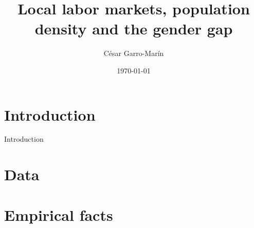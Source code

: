 \documentclass[10pt]{beamer}
\title{Local labor markets, population density and the gender gap}
\date{\today}
\author{C\'esar Garro-Mar\'in}
\institute{Boston University}
\newcommand{\bitem}{\begin{itemize}}
\newcommand{\eitem}{\end{itemize}}
\newcommand{\benu}{\begin{enumerate}}
\newcommand{\eenu}{\end{enumerate}}
\begin{document}
\maketitle

\section{Introduction}
\begin{frame}{Introduction} 
\end{frame}

\section{Data}

\section{Empirical facts}



\end{document}
